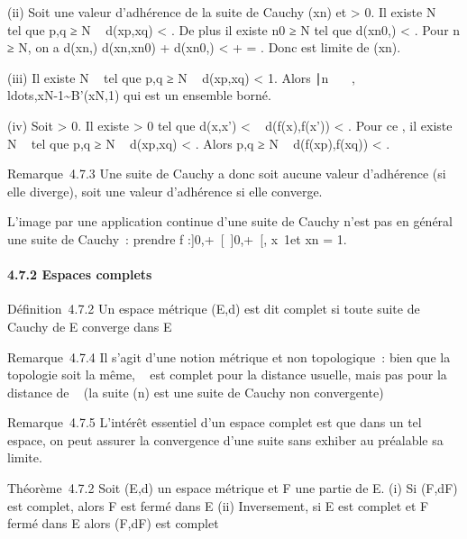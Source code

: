 (ii) Soit \ell une valeur d'adhérence de la suite de Cauchy (xn)
et \epsilon \textgreater{} 0. Il existe N \in {}~ tel que p,q ≥ N \rigtharrow~
d(xp,xq) \textless{} \epsilon{}. De plus il existe
n0 ≥ N tel que d(xn0,\ell) \textless{} \epsilon{}.
Pour n ≥ N, on a d(xn,\ell) \leq
d(xn,xn0) + d(xn0,\ell)
\textless{} \epsilon{} + \epsilon{} = \epsilon. Donc \ell est limite de (xn).

(iii) Il existe N \in {}~ tel que p,q ≥ N \rigtharrow~ d(xp,xq)
\textless{} 1. Alors
\xn∣n \in
{}~\
\subset~,\\ldots,xN-1\~
\cup B'(xN,1) qui est un ensemble borné.

(iv) Soit \epsilon \textgreater{} 0. Il existe \eta \textgreater{} 0 tel que
d(x,x') \textless{} \eta \rigtharrow~ d(f(x),f(x')) \textless{} \epsilon. Pour ce \eta, il
existe N \in \mathbb{N}~ tel que p,q ≥ N \rigtharrow~ d(xp,xq) \textless{}
\eta. Alors p,q ≥ N \rigtharrow~ d(f(xp),f(xq)) \textless{} \epsilon.

Remarque~4.7.3 Une suite de Cauchy a donc soit aucune valeur d'adhérence
(si elle diverge), soit une valeur d'adhérence si elle converge.

L'image par une application continue d'une suite de Cauchy n'est pas en
général une suite de Cauchy~: prendre f :{]}0,+\infty~{[}\rightarrow~{]}0,+\infty~{[},
x\mapsto~1\diagupx et xn = 1\diagupn.

\paragraph{4.7.2 Espaces complets}

Définition~4.7.2 Un espace métrique (E,d) est dit complet si toute suite
de Cauchy de E converge dans E

Remarque~4.7.4 Il s'agit d'une notion métrique et non topologique~: bien
que la topologie soit la même, ~ est complet pour la distance usuelle,
mais pas pour la distance de \overline\mathbb{R}~ (la suite (n)
est une suite de Cauchy non convergente)

Remarque~4.7.5 L'intérêt essentiel d'un espace complet est que dans un
tel espace, on peut assurer la convergence d'une suite sans exhiber au
préalable sa limite.

Théorème~4.7.2 Soit (E,d) un espace métrique et F une partie de E. (i)
Si (F,dF) est complet, alors F est fermé dans E (ii)
Inversement, si E est complet et F fermé dans E alors (F,dF)
est complet

